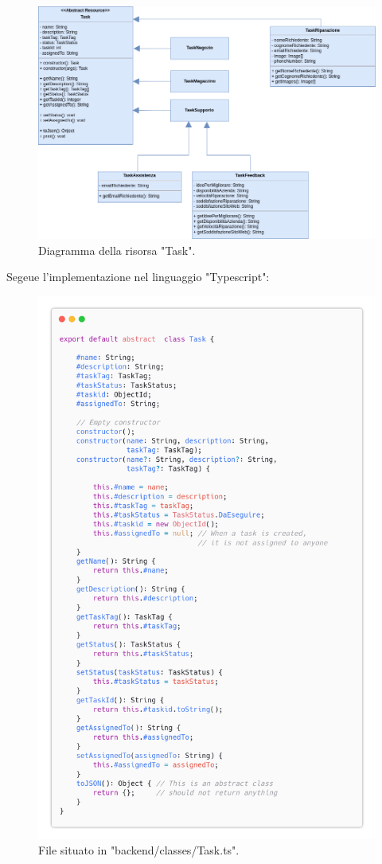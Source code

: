 \documentclass{report}
\begin{document}
\begin{figure}[H]
	\centering\includegraphics[width=1\textwidth]{images/resource_task.png}
	Diagramma della risorsa "Task".
\end{figure}

Segeue l'implementazione nel linguaggio "Typescript":

\begin{figure}[H]
	\centering\includegraphics[width=1\textwidth]{images/code_task.png}
	File situato in "backend/classes/Task.ts".
\end{figure}
\end{document}
